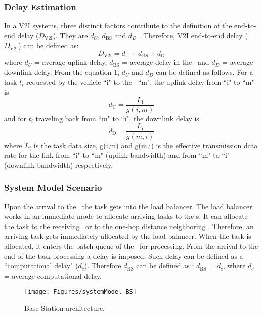 \subsubsection{\textbf{Delay Estimation}}
In a V2I systems, three distinct factors contribute to the definition of the end-to-end delay ($D_\textrm{V2I}$). They are $d_U$, $d_\textrm{BS}$  and $d_D$ \cite{mostafa2011}. Therefore, V2I end-to-end delay ($D_\textrm{V2I}$) can be defined as: 
\begin{equation}
D_\textrm{V2I} = d_\textrm{U} + d_\textrm{BS} + d_\textrm{D} \label{eq:1}
\end{equation} 
where $d_U$  = average uplink delay, $d_\textrm{BS}$  = average delay in the \bs~and $d_D$  = average downlink delay. From the equation 1, $d_U$  and $d_D$ can be defined as follows. For a task $t_i$  requested by the vehicle ``i" to the \bs~``m", the uplink delay from ``i" to ``m" is \begin{equation} d_\textrm{U} =  \frac{L_\textrm{i}}{g(i,m)} \label{eq:2} \end{equation} and for $t_i$ traveling back from ``m" to ``i", the downlink delay is \begin{equation} d_\textrm{D} =  \frac{L_\textrm{i}}{g(m,i)} \label{eq:3} \end{equation} where $L_i$  is the task data size, g(i,m) and g(m,i) is the effective transmission data rate for the link from ``i" to ``m" (uplink bandwidth) and from ``m" to ``i" (downlink bandwidth) respectively.

\subsubsection{System Model Scenario}
Upon the arrival to the \bs~the task gets into the load balancer. The load balancer works in an immediate mode to allocate arriving tasks to the \bs s. It can allocate the task to the receiving \bs~or to the one-hop distance neighboring \bs. Therefore, an arriving task gets immediately allocated by the load balancer. When the task is allocated, it enters the batch queue of the \bs~for processing. From the arrival to the end of the task processing a delay is imposed. Such delay can be defined as a ``computational delay" ($d_c$). Therefore $d_\textrm{BS}$ can be defined as :  $d_\textrm{BS}$ = $d_c$, where $d_c$ = average computational delay.

\begin{figure}[h!]
\centering	
\texttt{[image: Figures/systemModel\_BS]}
\caption{Base Station architecture.}
\end{figure}

  
